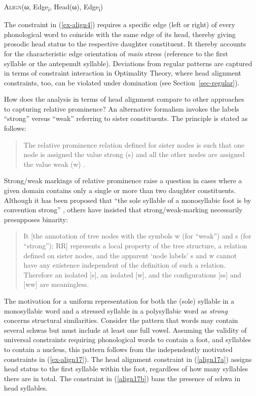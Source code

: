 \documentclass[output=paper
 ,nobabel
 ,draftmode
 ,colorlinks, citecolor=brown
]{langscibook}
\begin{document}
\ea\label{ex-align4}
\textsc{Align}(ω, Edge\textsubscript{i}, Head(ω), Edge\textsubscript{i})
\z

\noindent
The constraint in (\ref{ex-align4}) requires a specific edge (left or right) of every phonological
word to coincide with the same edge of its head, thereby giving prosodic head status to the
respective daughter constituent. It thereby accounts for the characteristic edge orientation of
\emph{main} stress (\eg reference to the first syllable or the antepenult syllable). Deviations from regular patterns are captured in terms of constraint interaction in Optimality Theory, where head alignment constraints, too, can be violated under domination (see Section~\ref{sec-regular}).  

How does the analysis in terms of head alignment compare to other approaches to capturing relative prominence? An alternative formalism invokes the labels ``strong'' versus ``weak'' referring to sister constituents. The principle is stated as follows:

\begin{quote}
The relative prominence relation defined for sister nodes is such that one node is assigned the value strong (s) and all the other nodes are assigned the value weak (w) \citep[7]{NesporVogel2007}. 
\end{quote}

\noindent
Strong/weak markings of relative prominence raise a question in cases where a given domain contains only a single or more than two daughter constituents. Although it has been proposed that ``the sole syllable of a monosyllabic foot is by convention strong'' \citep[15]{Selkirk1986}, others have insisted that strong/weak-marking necessarily presupposes binarity: 

\begin{quote}
It [the annotation of tree nodes with the symbols w (for ``weak'') and s (for ``strong''); RR] represents a local property of the tree structure, a relation defined on sister nodes, and the apparent `node labels' s and w cannot have any existence independent of the definition of such a relation. Therefore an isolated [s], an isolated [w], and the configurations [ss] and [ww] are meaningless. \citep[256]{LibermanPrince1977}
\end{quote}

\noindent
The motivation for a uniform representation for both the (sole) syllable in a monosyllabic word and a stressed syllable in a polysyllabic word as \emph{strong} concerns structural similarities. Consider the pattern that  words may contain several schwas but must include at least one full vowel. Assuming the validity of universal constraints requiring phonological words to contain a foot, and syllables to contain a nucleus, this pattern follows from the independently motivated constraints in (\ref{ex-align17}). The head alignment constraint in (\ref{align17a}) assigns head status to the first syllable within the foot, regardless of how many syllables there are in total. The constraint in (\ref{align17b}) bans the presence of schwa in head syllables. 
\end{document}

